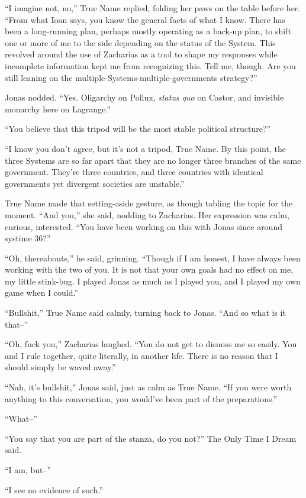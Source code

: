 ``I imagine not, no,'' True Name replied, folding her paws on the table before her. ``From what Ioan says, you know the general facts of what I know. There has been a long-running plan, perhaps mostly operating as a back-up plan, to shift one or more of me to the side depending on the status of the System. This revolved around the use of Zacharias as a tool to shape my responses while incomplete information kept me from recognizing this. Tell me, though. Are you still leaning on the multiple-Systems-multiple-governments strategy?''

Jonas nodded. ``Yes. Oligarchy on Pollux, \emph{status quo} on Castor, and invisible monarchy here on Lagrange.''

``You believe that this tripod will be the most stable political structure?''

``I know you don't agree, but it's not a tripod, True Name. By this point, the three Systems are so far apart that they are no longer three branches of the same government. They're three countries, and three countries with identical governments yet divergent societies are unstable.''

True Name made that setting-aside gesture, as though tabling the topic for the moment. ``And you,'' she said, nodding to Zacharias. Her expression was calm, curious, interested. ``You have been working on this with Jonas since around systime 36?''

``Oh, thereabouts,'' he said, grinning. ``Though if I am honest, I have always been working with the two of you. It is not that your own goals had no effect on me, my little stink-bug. I played Jonas as much as I played you, and I played my own game when I could.''

``Bullshit,'' True Name said calmly, turning back to Jonas. ``And so what is it that--''

``Oh, fuck you,'' Zacharias laughed. ``You do not get to dismiss me so easily. You and I rule together, quite literally, in another life. There is no reason that I should simply be waved away.''

``Nah, it's bullshit,'' Jonas said, just as calm as True Name. ``If you were worth anything to this conversation, you would've been part of the preparations.''

``What--''

``You say that you are part of the stanza, do you not?'' The Only Time I Dream said.

``I am, but--''

``I see no evidence of such.''

